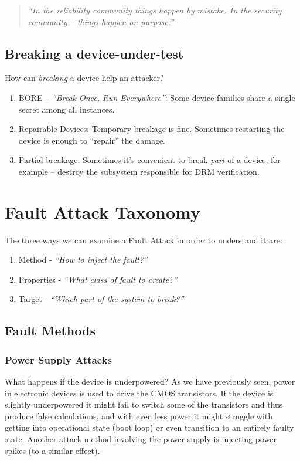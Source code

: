 \begin{quote}
	\textit{``In the reliability community things happen by mistake. In the security community -- things happen on purpose.''}
\end{quote}

\subsection*{Breaking a device-under-test}\label{subsec:breaking_a_device_under_test}
How can \emph{breaking} a device help an attacker?

\begin{enumerate}
	\item BORE -- \textit{``Break Once, Run Everywhere''}: Some device families
	share a single secret among all instances.
	\item Repairable Devices: Temporary breakage is fine. Sometimes restarting
	the device is enough to ``repair'' the damage.
	\item Partial breakage: Sometimes it's convenient to break \emph{part} of a
	device, for example -- destroy the subsystem responsible for DRM
	verification.
\end{enumerate}

\section{Fault Attack Taxonomy}\label{sec:fault_attack_taxonomy}
The three ways we can examine a Fault Attack in order to understand it are:
\begin{enumerate}
	\item Method - \emph{``How to inject the fault?''}
	\item Properties - \emph{``What class of fault to create?''}
	\item Target - \emph{``Which part of the system to break?''}
\end{enumerate}

\subsection{Fault Methods}\label{subsec:fault_methods}

\subsubsection{Power Supply Attacks}\label{subsubsec:power_supply_attacks}
What happens if the device is underpowered? As we have previously seen, power in
electronic devices is used to drive the CMOS transistors. If the device is
slightly underpowered it might fail to switch some of the transistors and thus
produce false calculations, and with even less power it might  struggle with
getting into operational state (boot loop) or even transition to an entirely
faulty state. Another attack method involving the power supply is injecting
power spikes (to a similar effect).

